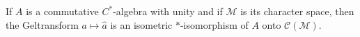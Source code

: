 If $A$ is a commutative $C^*$-algebra with unity and if $\mathcal{M}$ is its character space, then the Gel\fand transform $a \mapsto \hat{a}$ is an isometric $*$-isomorphism of $A$ onto $\mathcal{C}(\mathcal{M})$.
